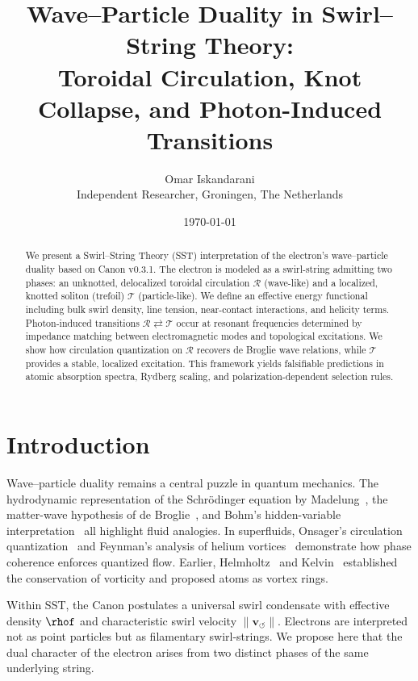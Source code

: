 \documentclass[11pt,a4paper]{article}
\title{Wave--Particle Duality in Swirl--String Theory: \\
Toroidal Circulation, Knot Collapse, and Photon-Induced Transitions}
\author{Omar Iskandarani \\ Independent Researcher, Groningen, The Netherlands}
\date{\today}
\begin{document}
\maketitle

\begin{abstract}
    We present a Swirl--String Theory (SST) interpretation of the electron’s wave--particle duality based on Canon v0.3.1. The electron is modeled as a swirl-string admitting two phases: an unknotted, delocalized toroidal circulation $\mathcal{R}$ (wave-like) and a localized, knotted soliton (trefoil) $\mathcal{T}$ (particle-like). We define an effective energy functional including bulk swirl density, line tension, near-contact interactions, and helicity terms. Photon-induced transitions $\mathcal{R} \rightleftarrows \mathcal{T}$ occur at resonant frequencies determined by impedance matching between electromagnetic modes and topological excitations. We show how circulation quantization on $\mathcal{R}$ recovers de Broglie wave relations, while $\mathcal{T}$ provides a stable, localized excitation. This framework yields falsifiable predictions in atomic absorption spectra, Rydberg scaling, and polarization-dependent selection rules.
\end{abstract}

\section{Introduction}

    Wave--particle duality remains a central puzzle in quantum mechanics. The hydrodynamic representation of the Schrödinger equation by Madelung~\cite{Madelung1927}, the matter-wave hypothesis of de Broglie~\cite{deBroglie1925}, and Bohm’s hidden-variable interpretation~\cite{Bohm1952a,Bohm1952b} all highlight fluid analogies. In superfluids, Onsager’s circulation quantization~\cite{Onsager1949} and Feynman’s analysis of helium vortices~\cite{Feynman1955} demonstrate how phase coherence enforces quantized flow. Earlier, Helmholtz~\cite{Helmholtz1858} and Kelvin~\cite{Kelvin1869} established the conservation of vorticity and proposed atoms as vortex rings.

    Within SST, the Canon postulates a universal swirl condensate with effective density $\rhof$ and characteristic swirl velocity $\|\mathbf{v}_{\circlearrowleft}\|$. Electrons are interpreted not as point particles but as filamentary swirl-strings. We propose here that the dual character of the electron arises from two distinct phases of the same underlying string.
\end{document}
